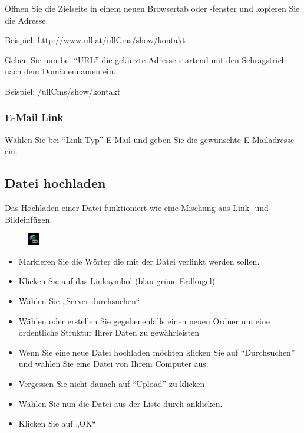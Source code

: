 \documentclass[article, a4paper, oneside, 11pt]{memoir}
\begin{document}
Öffnen Sie die Zielseite in einem neuen Browsertab oder -fenster und kopieren Sie die Adresse.

Beispiel: http://www.ull.at/ullCms/show/kontakt

Geben Sie nun bei "`URL"' die gekürzte Adresse startend mit den Schrägstrich nach dem Domänennamen ein.

Beispiel: /ullCms/show/kontakt

\subsubsection{E-Mail Link}

Wählen Sie bei "`Link-Typ"' E-Mail und geben Sie die gewünschte E-Mailadresse ein.



\subsection{Datei hochladen}

Das Hochladen einer Datei funktioniert wie eine Mischung aus Link- und Bildeinfügen.


\begin{figure}
\centering
\includegraphics[width=0.5cm,height=0.5cm]{link_icon}
\end{figure}

\begin{itemize}
\item Markieren Sie die Wörter die mit der Datei verlinkt werden sollen.
\item Klicken Sie auf das Linksymbol (blau-grüne Erdkugel)
\item Wählen Sie „Server durchsuchen“
\item Wählen oder erstellen Sie gegebenenfalls einen neuen Ordner um eine ordentliche Struktur Ihrer Daten zu gewährleisten
\item Wenn Sie eine neue Datei hochladen möchten klicken Sie auf "`Durchsuchen"' und wählen Sie eine Datei von Ihrem Computer aus.
\item Vergessen Sie nicht danach auf "`Upload"' zu klicken
\item Wählen Sie nun die Datei aus der Liste durch anklicken.
\item Klicken Sie auf „OK“
\end{itemize}
\end{document}

